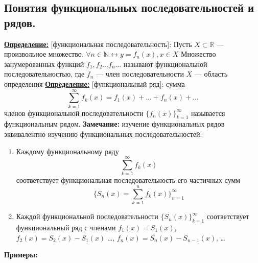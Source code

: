 \documentclass[a4paper,12pt]{article} %
\begin{document}
\subsection{Понятия функциональных последовательностей и рядов.}
\underline{\textbf{Определение:}} [функциональная последовательность]:\newline
Пусть $X \subset \mathds{R}$ --- произвольное множество. \newline
\hspace*{5mm}$\forall n \in \mathds{N} \leftrightarrow y = f_n(x), x \in X$ \newline 
Множество занумерованных функций $f_1, f_2 \dots f_n \dots $ называют функциональной последовательностью, где  \newline
\hspace*{50mm}$f_n$ --- член последовательности \newline
\hspace*{50mm}   $X$ --- область определения 
\newline \newline
\underline{\textbf{Определение:}} [функциональный ряд]:\newline
сумма $${\sum\limits_{k = 1}^{\infty}}  f_k(x) = f_1(x) + \dots + f_n(x) + \dots$$ \newline членов функциональной последовательности $\{f_n(x)\}_{k=1}^\infty$ называется функциональным рядом.
\newline
\textbf{Замечание:} изучение функциональных рядов эквивалентно изучению функциональных последовательностей:\newline
\begin{enumerate}
	\item Каждому функциональному ряду $${\sum\limits_{k = 1}^{\infty}}f_k(x)$$ соответствует функциональная последовательность его частичных сумм $$\{S_n(x) = \sum\limits_{k = 1}^{n}f_k(x)\}_{n=1}^\infty$$ 
	\item Каждой функциональной последовательности $\{S_n(x)\}_{k=1}^\infty$ соответствует функциональный ряд с членами $f_1(x) = S_1(x)$, $f_2(x) = S_2(x) - S_1(x)$ \dots, $f_n(x) = S_n(x) - S_{n-1}(x)$, \dots 
	
\end{enumerate}
\noindent \textbf{Примеры:}
\end{document}
